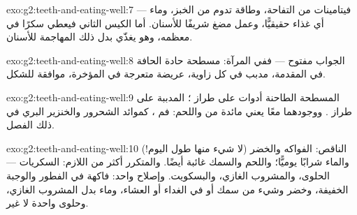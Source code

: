 \begin{solution}{exo:g2:teeth-and-eating-well:7}
فيتامينات من التفاحة، وطاقة تدوم من الخبز، وماء --- أي غذاء
حقيقيًّا، وعمل مضغ شريفًا للأسنان. أما الكيس الثاني فيعطي سكرًا في
معظمه، وهو يغذّي بدل ذلك  المهاجمة للأسنان.
\end{solution}

\begin{solution}{exo:g2:teeth-and-eating-well:8}
الجواب مفتوح --- ففي المرآة:  مسطحة حادة الحافة في المقدمة،
 مدبب في كل زاوية،  عريضة متعرجة في المؤخرة، موافقة
للشكل.
\end{solution}

\begin{solution}{exo:g2:teeth-and-eating-well:9}
  المسطحة  الطاحنة أدوات على طراز ؛
 المدببة على طراز . ووجودهما معًا يعني مائدة من
 واللحم: فم ، كموائد الشحرور والخنزير البري في ذلك
الفصل.
\end{solution}

\begin{solution}{exo:g2:teeth-and-eating-well:10}
الناقص: الفواكه والخضر (لا شيء منها طول اليوم!) والماء شرابًا
يوميًّا؛ واللحم والسمك  غائبة أيضًا. والمتكرر أكثر من اللازم:
السكريات --- الحلوى، والمشروب الغازي، والبسكويت. وإصلاح واحد:
فاكهة في الفطور والوجبة الخفيفة، وخضر وشيء من سمك أو  في الغداء
أو العشاء، وماء بدل المشروب الغازي، وحلوى واحدة لا غير.
\end{solution}
